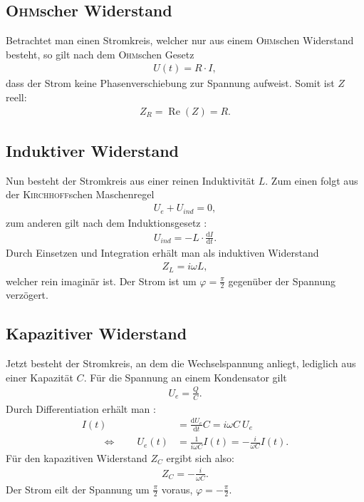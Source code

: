 \documentclass[12pt,a4paper,titlepage,headinclude]{scrartcl}
\numberwithin{equation}{subsection}
\renewcommand{\d}{\ensuremath{\mathrm{d}}} %
\newcommand{\aeqiv}{\ensuremath{\qquad \Longleftrightarrow \qquad}} %
\newcommand{\person}[1]{\textsc{#1}}
\begin{document}
\subsection{\person{Ohm}scher Widerstand}
Betrachtet man einen Stromkreis, welcher nur aus einem \person{Ohm}schen Widerstand besteht, so gilt nach dem \person{Ohm}schen Gesetz
\begin{align}
	U(t)=R\cdot I,
	\label{eq:ohm}
\end{align}
dass der Strom keine Phasenverschiebung zur Spannung aufweist. Somit ist $Z$ reell:
\begin{align}
	Z_{R}=\operatorname{Re}(Z)=R.
	\label{eq:zR}
\end{align}
\subsection{Induktiver Widerstand}
Nun besteht der Stromkreis aus einer reinen Induktivität $L$. Zum einen folgt aus der \person{Kirchhoff}schen Maschenregel \cite[55]{demtroeder2}
\begin{align}
	U_e+U_{ind}=0,
	\label{eq:indmasche}
\end{align}
zum anderen gilt nach dem Induktionsgesetz \cite[131]{demtroeder2}:
\begin{align}
	U_{ind}=-L\cdot\frac{\d I}{\d t}.
	\label{eq:uind}
\end{align}
Durch Einsetzen und Integration erhält man als induktiven Widerstand \cite[256]{nol3}
\begin{align}
	Z_{L}=i\omega L,
	\label{eq:zL}
\end{align}
welcher rein imaginär ist. Der Strom ist um $\varphi=\frac{\pi}{2}$ gegenüber der Spannung verzögert.
\subsection{Kapazitiver Widerstand}
Jetzt besteht der Stromkreis, an dem die Wechselspannung anliegt, lediglich aus einer Kapazität $C$. Für die Spannung an einem Kondensator gilt \cite[152]{demtroeder2}
\begin{align}
	U_e=\frac{Q}{C}.
	\label{eq:kond}
\end{align}
Durch Differentiation erhält man \cite[257]{nol3}:
\begin{align}
	I(t)&=\frac{\d U_e}{\d t}C=i\omega C~ U_e\\
	\aeqiv U_e(t)&=\frac{1}{i\omega C}I(t)=-\frac{i}{\omega C}I(t).
	\label{eq:herleitungzC}
\end{align}
Für den kapazitiven Widerstand $Z_C$ ergibt sich also:
\begin{align}
	Z_C=-\frac{i}{\omega C}.
	\label{eq:zC}
\end{align}
Der Strom eilt der Spannung um $\frac{\pi}{2}$ voraus, $\varphi=-\frac{\pi}{2}$.
\end{document}
